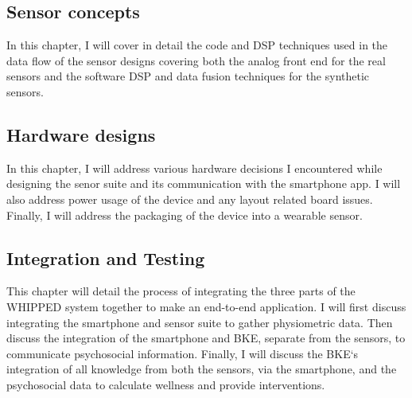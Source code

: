 \subsection{  }

\iffalse
\subsection{ Sensor concepts}
\label{subsec:Chapter4SensorConcepts}
In this chapter, I will cover in detail the code and DSP techniques used in the data flow of the sensor designs covering both the analog front end for the real sensors and the software DSP and data fusion techniques for the synthetic sensors.

\subsection{ Hardware designs}
\label{subsec:Chapter5HardwareDesigns}
In this chapter, I will address various hardware decisions I encountered while designing the senor suite and its communication with the smartphone app. I will also address power usage of the device and any layout related board issues. Finally, I will address the packaging of the device into a wearable sensor.

\subsection{ Integration and Testing}
\label{subsec:Chapter6IntegrationAndTesting}
This chapter will detail the process of integrating the three parts of the WHIPPED system together to make an end-to-end application. I will first discuss integrating the smartphone and sensor suite to gather physiometric data. Then discuss the integration of the smartphone and BKE, separate from the sensors, to communicate psychosocial information. Finally, I will discuss the BKE‘s integration of all knowledge from both the sensors, via the smartphone, and the psychosocial data to calculate wellness and provide interventions.



%

